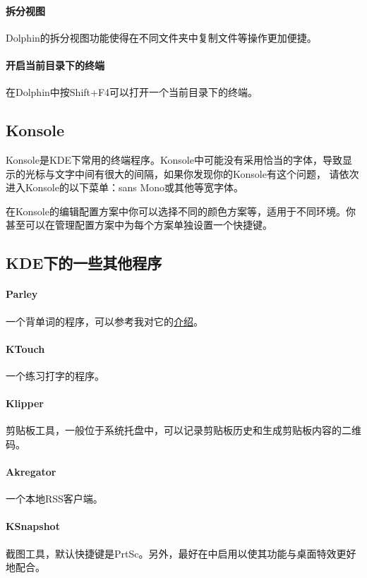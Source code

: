 \paragraph{拆分视图} Dolphin的拆分视图功能使得在不同文件夹中复制文件等操作更加便捷。

\paragraph{开启当前目录下的终端} 在Dolphin中按Shift+F4可以打开一个当前目录下的终端。


\subsection{Konsole}
Konsole是KDE下常用的终端程序。Konsole中可能没有采用恰当的字体，导致显示的光标与文字中间有很大的间隔，如果你发现你的Konsole有这个问题，
请依次进入Konsole的以下菜单：\me{}\me{}\me{} sans Mono或其他等宽字体。

在Konsole的编辑配置方案中你可以选择不同的颜色方案等，适用于不同环境。你甚至可以在管理配置方案中为每个方案单独设置一个快捷键。
\subsection{KDE下的一些其他程序}
\paragraph{Parley} 一个背单词的程序，可以参考我对它的\href{http://zpj.blog.ustc.edu.cn/?p=294}{介绍}。

\paragraph{KTouch} 一个练习打字的程序。

\paragraph{Klipper} 剪贴板工具，一般位于系统托盘中，可以记录剪贴板历史和生成剪贴板内容的二维码。

\paragraph{Akregator} 一个本地RSS客户端。

\paragraph{KSnapshot} 截图工具，默认快捷键是PrtSc。另外，最好在\me{}中启用以使其功能与桌面特效更好地配合。